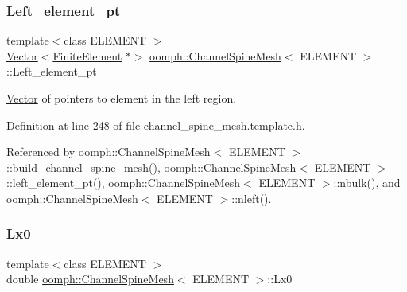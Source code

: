 \mbox{\label{classoomph_1_1ChannelSpineMesh_aaa8df0751eebdab02466afa0253dedbd}} 
\subsubsection{\texorpdfstring{Left\+\_\+element\+\_\+pt}{Left\_element\_pt}}
{\footnotesize\ttfamily template$<$class E\+L\+E\+M\+E\+NT $>$ \\
\hyperlink{classoomph_1_1Vector}{Vector}$<$\hyperlink{classoomph_1_1FiniteElement}{Finite\+Element} $\ast$$>$ \hyperlink{classoomph_1_1ChannelSpineMesh}{oomph\+::\+Channel\+Spine\+Mesh}$<$ E\+L\+E\+M\+E\+NT $>$\+::Left\+\_\+element\+\_\+pt\hspace{0.3cm}{\ttfamily [protected]}}



\hyperlink{classoomph_1_1Vector}{Vector} of pointers to element in the left region. 



Definition at line 248 of file channel\+\_\+spine\+\_\+mesh.\+template.\+h.



Referenced by oomph\+::\+Channel\+Spine\+Mesh$<$ E\+L\+E\+M\+E\+N\+T $>$\+::build\+\_\+channel\+\_\+spine\+\_\+mesh(), oomph\+::\+Channel\+Spine\+Mesh$<$ E\+L\+E\+M\+E\+N\+T $>$\+::left\+\_\+element\+\_\+pt(), oomph\+::\+Channel\+Spine\+Mesh$<$ E\+L\+E\+M\+E\+N\+T $>$\+::nbulk(), and oomph\+::\+Channel\+Spine\+Mesh$<$ E\+L\+E\+M\+E\+N\+T $>$\+::nleft().

\mbox{\label{classoomph_1_1ChannelSpineMesh_a3d61af363a8da156f4fe6d10e62f73c6}} 
\subsubsection{\texorpdfstring{Lx0}{Lx0}}
{\footnotesize\ttfamily template$<$class E\+L\+E\+M\+E\+NT $>$ \\
double \hyperlink{classoomph_1_1ChannelSpineMesh}{oomph\+::\+Channel\+Spine\+Mesh}$<$ E\+L\+E\+M\+E\+NT $>$\+::Lx0\hspace{0.3cm}{\ttfamily [protected]}}



